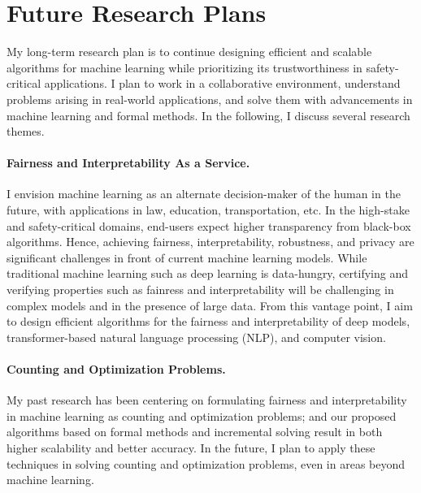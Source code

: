 \documentclass[11pt]{article}
\begin{document}
	

	
	\section*{Future Research Plans}
	 My long-term research plan is to continue designing efficient and scalable algorithms for machine learning while prioritizing its trustworthiness in safety-critical applications. I plan to work in a collaborative environment, understand problems arising in real-world applications, and solve them with advancements in machine learning and formal methods. In the following, I discuss several research themes.
	 
	 
	 \paragraph{Fairness and Interpretability As a Service.} I envision machine learning as an alternate decision-maker of the human in the future, with applications in law, education, transportation, etc. In the high-stake and safety-critical domains, end-users expect higher transparency from black-box algorithms. Hence, achieving fairness, interpretability, robustness, and privacy are significant challenges in front of current machine learning models. While traditional machine learning such as deep learning is data-hungry, certifying and verifying properties such as fainress and interpretability will be challenging in complex models and in the presence of large data. From this vantage point, I aim to design efficient algorithms for the fairness and interpretability of deep models, transformer-based natural language processing (NLP), and computer vision. 
	 
	 
	 \paragraph{Counting and Optimization Problems.} My past research has been centering on formulating fairness and interpretability in machine learning as counting and optimization problems; and our proposed algorithms based on formal methods and incremental solving result in both higher scalability and better accuracy. In the future, I plan to apply these techniques in solving counting and optimization problems, even in areas beyond machine learning. 
	
	
			
\end{document}
